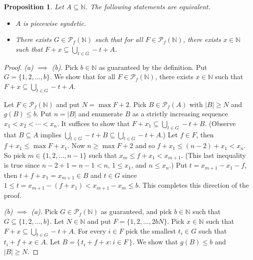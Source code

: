 \documentclass[12pt,showtrims]{memoir}
\theoremstyle{plain}
\newtheorem{prop}[thm]{Proposition}
\theoremstyle{definition}
\newcommand{\bbN}{\mathbb{N}}
\newcommand{\Pf}{\mathcal{P}_f}
\begin{document}
\begin{prop}
  Let $A \subseteq \bbN$.
  The following statements are equivalent.
  \begin{itemize}
    \item[(a)] $A$ is piecewise syndetic.
    
    \item[(b)] There exists $G \in \Pf(\bbN)$ such that for all $F \in \Pf(\bbN)$, there exists $x \in \bbN$ such that $F+x \subseteq \bigcup_{t \in G} -t+A$. 
  \end{itemize}
\end{prop}
\begin{proof}
  \textsl{(a) $\implies$ (b).}
  Pick $b \in \bbN$ as guaranteed by the definition. 
  Put $G = \{1, 2, \ldots, b\}$.
  We show that for all $F \in \Pf(\bbN)$, there exists $x \in \bbN$ such that $F+x \subseteq \bigcup_{t \in G} -t + A$.

  Let $F \in \Pf(\bbN)$ and put $N =  \max F + 2$. 
  Pick $B \in \Pf(A)$ with $|B| \ge N$ and $g(B) \le b$. 
  Put $n = |B|$ and enumerate $B$ as a strictly increasing sequence $x_1 < x_2 < \cdots  < x_n$.
  It suffices to show that $F + x_1 \subseteq \bigcup_{t \in G} -t + B$.
  (Observe that $B \subseteq A$ implies $\bigcup_{t \in G} -t + B \subseteq \bigcup_{t \in G} -t + A$.)
  Let $f \in F$, then $f + x_1 \le \max F + x_1$. 
  Now $n \ge \max F + 2$ and so $f + x_1 \le (n-2) + x_1 < x_n$. 
  So pick $m \in \{1, 2, \ldots, n-1\}$ such that $x_m \le f+x_1  < x_{m+1}$. 
  (This last inequality is true since $n-2+1 = n-1 < n$, $1 \le x_1$, and $n \le x_n$.)
  Put $t = x_{m+1} - x_1 - f$, then $t + f + x_1 = x_{m+1} \in B$ and $t \in G$ since $1 \le t = x_{m+1}- (f + x_1) < x_{m+1} - x_m \le b$. 
  This completes this direction of the proof.  
  
  \textsl{(b) $\implies$ (a).}
  Pick $G \in \Pf(\bbN)$ as guaranteed, and pick $b \in \bbN$ such that $G \subseteq \{1, 2, \ldots, b\}$. 
  Let $N \in \bbN$ and put $F = \{1, 2, \ldots, 2bN\}$. 
  Pick $x \in \bbN$ such that $F + x \subseteq \bigcup_{t \in G} -t+A$. 
  For every $i \in F$ pick the smallest $t_i \in G$ such that $t_i + f + x \in A$. 
  Let $B = \{\, t_i + f + x : i \in F \,\}$.
  We show that $g(B) \le b$ and $|B| \ge N$.


\end{proof}
\end{document}
